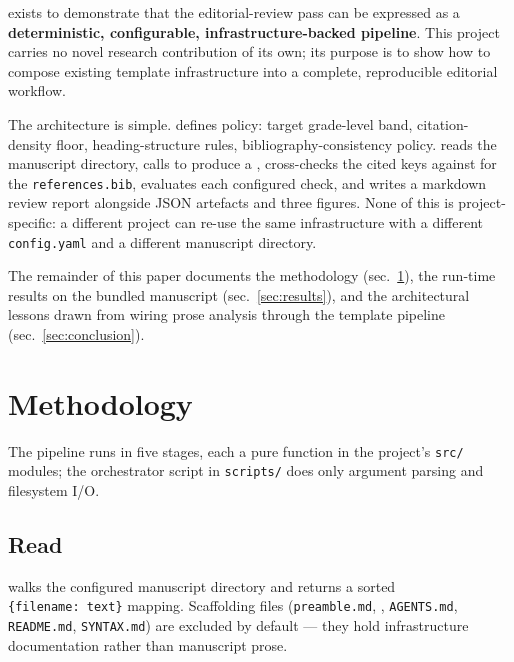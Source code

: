 \documentclass[
  english,
]{article}
\begin{document}
 exists to demonstrate that the
editorial-review pass can be expressed as a \textbf{deterministic,
configurable, infrastructure-backed pipeline}. This project carries no
novel research contribution of its own; its purpose is to show how to
compose existing template infrastructure into a complete, reproducible
editorial workflow.

The architecture is simple.  defines
policy: target grade-level band, citation-density floor,
heading-structure rules, bibliography-consistency policy.
 reads the
manuscript directory, calls
\href{../../../../infrastructure/prose/SKILL.md}{}
to produce a , cross-checks the cited keys
against
\href{../../../../infrastructure/reference/citation/SKILL.md}{}
for the \texttt{references.bib}, evaluates each configured check, and
writes a markdown review report alongside JSON artefacts and three
figures. None of this is project-specific: a different project can
re-use the same infrastructure with a different \texttt{config.yaml} and
a different manuscript directory.

The remainder of this paper documents the methodology
(sec.~\ref{sec:methodology}), the run-time results on the bundled
manuscript (sec.~\ref{sec:results}), and the architectural lessons drawn
from wiring prose analysis through the template pipeline
(sec.~\ref{sec:conclusion}).

\newpage

\section{Methodology}\label{sec:methodology}

The pipeline runs in five stages, each a pure function in the project's
\texttt{src/} modules; the orchestrator script in \texttt{scripts/} does
only argument parsing and filesystem I/O.

\subsection{Read}\label{read}

 walks the configured
manuscript directory and returns a sorted \texttt{\{filename:\ text\}}
mapping. Scaffolding files (\texttt{preamble.md},
, \texttt{AGENTS.md}, \texttt{README.md},
\texttt{SYNTAX.md}) are excluded by default --- they hold infrastructure
documentation rather than manuscript prose.
\end{document}

